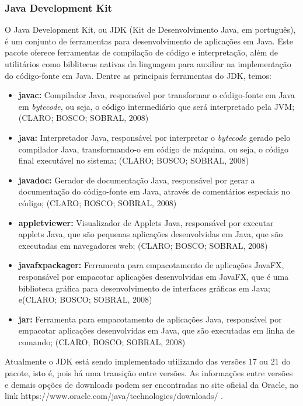 \documentclass[a4paper,12pt]{article}
\begin{document}
\subsubsection{Java Development Kit}
O Java Development Kit, ou JDK (Kit de Desenvolvimento Java, em português), é um conjunto de ferramentas para desenvolvimento de aplicações em Java. Este pacote oferece ferramentas 
de compilação de código e interpretação, além de utilitários como biblitecas nativas da linguagem para auxiliar na implementação do código-fonte em Java. Dentre as principais ferramentas do JDK, temos:
\begin{itemize}
	\item \textbf{javac:} Compilador Java, responsável por transformar o código-fonte em Java em \textit{bytecode}, ou seja, o código intermediário que será interpretado pela JVM; (CLARO; BOSCO; SOBRAL, 2008)
	\item \textbf{java:} Interpretador Java, responsável por interpretar o \textit{bytecode} gerado pelo compilador Java, transformando-o em código de máquina, ou seja, o código final executável no sistema; (CLARO; BOSCO; SOBRAL, 2008)
	\item \textbf{javadoc:} Gerador de documentação Java, responsável por gerar a documentação do código-fonte em Java, através de comentários especiais no código; (CLARO; BOSCO; SOBRAL, 2008)
	\item \textbf{appletviewer:} Visualizador de Applets Java, responsável por executar applets Java, que são pequenas aplicações desenvolvidas em Java, que são executadas em navegadores web; (CLARO; BOSCO; SOBRAL, 2008)
	\item \textbf{javafxpackager:} Ferramenta para empacotamento de aplicações JavaFX, responsável por empacotar aplicações desenvolvidas em JavaFX, que é uma biblioteca gráfica para desenvolvimento de interfaces gráficas em Java; e(CLARO; BOSCO; SOBRAL, 2008)
	\item \textbf{jar:} Ferramenta para empacotamento de aplicações Java, responsável por empacotar aplicações desenvolvidas em Java, que são executadas em linha de comando; (CLARO; BOSCO; SOBRAL, 2008)
\end{itemize}

Atualmente o JDK está sendo implementado utilizando das versões 17 ou 21 do pacote, isto é, pois há uma transição entre versões. As informações entre versões e demais opções de downloads 
podem ser encontradas no site oficial da Oracle, no link https://www.oracle.com/java/technologies/downloads/ .
\end{document}
